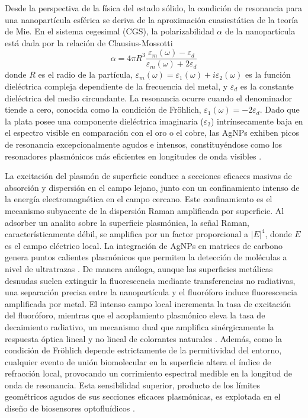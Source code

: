 Desde la perspectiva de la física del estado sólido, la condición de
resonancia para una nanopartícula esférica se deriva de la aproximación
cuasiestática de la teoría de Mie.
En el sistema cegesimal (CGS), la polarizabilidad $\alpha$ de la nanopartícula
está dada por la relación de Clausius-Mossotti
\begin{equation}
	\alpha=4\pi
	R^3\frac{\varepsilon_m(\omega)-\varepsilon_d}{\varepsilon_m(\omega)+2\varepsilon_d}
\end{equation}
donde $R$ es el radio de la partícula,
$\varepsilon_m(\omega)=\varepsilon_1(\omega)+i\varepsilon_2(\omega)$ es la
función dieléctrica compleja dependiente de la frecuencia del metal, y
$\varepsilon_d$ es la constante dieléctrica del medio circundante. La
resonancia ocurre cuando el denominador tiende a cero, conocida como la
condición de Fröhlich, $\varepsilon_1(\omega)=-2\varepsilon_d$. Dado que la
plata posee una componente dieléctrica imaginaria ($\varepsilon_2$)
intrínsecamente baja en el espectro visible en comparación con el oro o el
cobre, las AgNPs exhiben picos de resonancia excepcionalmente agudos e
intensos, constituyéndose como los resonadores plasmónicos más eficientes en
longitudes de onda visibles \cite{kelaniComparingSilverGold2024,
satiSilverNanoparticlesAgNPs2025}.

La excitación del plasmón de superficie conduce a secciones eficaces masivas
de absorción y dispersión en el campo lejano, junto con un confinamiento
intenso de la energía electromagnética en el campo cercano. Este confinamiento
es el mecanismo subyacente de la dispersión Raman amplificada por superficie.
Al adsorber un analito sobre la superficie plasmónica, la señal Raman,
característicamente débil, se amplifica por un factor proporcional a $|E|^4$,
donde $E$ es el campo eléctrico local. La integración de AgNPs en matrices de
carbono genera puntos calientes plasmónicos que permiten la detección de
moléculas a nivel de ultratrazas \cite{saadNovelSynthesisStudy2020}.
De manera análoga, aunque las superficies metálicas desnudas suelen extinguir la
fluorescencia mediante transferencias no radiativas, una separación precisa
entre la nanopartícula y el fluoróforo induce fluorescencia amplificada por
metal.
El intenso campo local incrementa la tasa de excitación del fluoróforo, mientras
que el acoplamiento plasmónico eleva la tasa de decaimiento radiativo, un
mecanismo dual que amplifica sinérgicamente la respuesta óptica lineal y no
lineal de colorantes naturales \cite{fathimaPlasmonEnhancedLinear2021}.
Además, como la condición de Fröhlich
depende estrictamente de la permitividad del entorno, cualquier evento de
unión biomolecular en la superficie altera el índice de refracción local,
provocando un corrimiento espectral medible en la longitud de onda de
resonancia. Esta sensibilidad superior, producto de los límites geométricos
agudos de sus secciones eficaces plasmónicas, es explotada en el diseño de
biosensores optofluídicos \cite{kelaniComparingSilverGold2024}.

